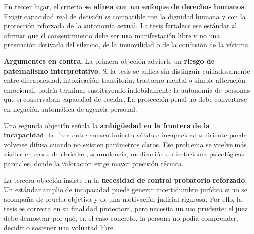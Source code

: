 \documentclass[
	spanish,
	letterpaper, oneside
]{article}
\begin{document}
En tercer lugar, el criterio \textbf{se alinea con un enfoque de derechos humanos}. Exigir capacidad real de decisión es compatible con la dignidad humana y con la protección reforzada de la autonomía sexual. La tesis fortalece ese estándar al afirmar que el consentimiento debe ser una manifestación libre y no una presunción derivada del silencio, de la inmovilidad o de la confusión de la víctima.

\textbf{Argumentos en contra.} La primera objeción advierte un \textbf{riesgo de paternalismo interpretativo}. Si la tesis se aplica sin distinguir cuidadosamente entre discapacidad, intoxicación transitoria, trastorno mental o simple alteración emocional, podría terminar sustituyendo indebidamente la autonomía de personas que sí conservaban capacidad de decidir. La protección penal no debe convertirse en negación automática de agencia personal.

Una segunda objeción señala la \textbf{ambigüedad en la frontera de la incapacidad}: la línea entre consentimiento válido e incapacidad suficiente puede volverse difusa cuando no existen parámetros claros. Ese problema se vuelve más visible en casos de ebriedad, somnolencia, medicación o afectaciones psicológicas parciales, donde la valoración exige mayor precisión técnica.

La tercera objeción insiste en la \textbf{necesidad de control probatorio reforzado}. Un estándar amplio de incapacidad puede generar incertidumbre jurídica si no se acompaña de prueba objetiva y de una motivación judicial rigurosa. Por ello, la tesis es correcta en su finalidad protectora, pero necesita un uso prudente: el juez debe demostrar por qué, en el caso concreto, la persona no podía comprender, decidir o sostener una voluntad libre.

%

\end{document}
